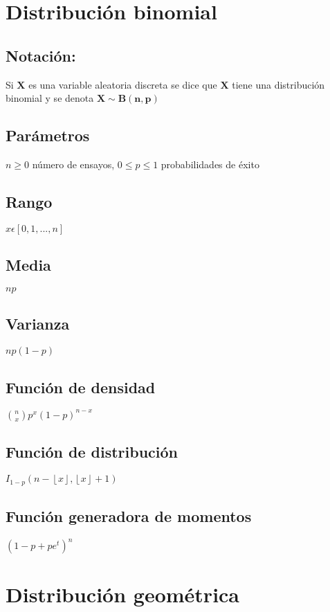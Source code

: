 \documentclass[es-lat]{article}
\begin{document}
\section{Distribución binomial}
\subsection{Notación:}

Si $\mathbf{X}$ es una variable aleatoria discreta se dice que $\mathbf{X}$ tiene una distribución binomial y se denota $\mathbf{X\sim B(n,p)}$ 

\subsection{Parámetros}
$n\geq 0$ número de ensayos, $0\leq p\leq 1$ probabilidades de éxito 

\subsection{Rango}
$x\epsilon [0,1,...,n]$

\subsection{Media}
$np$

\subsection{Varianza}
$np(1-p)$

\subsection{Función de densidad}
$\binom{n}{x}p^{x}(1-p)^{n-x}$

\subsection{Función de distribución}
$I_{1-p}(n-\left \lfloor x \right \rfloor,\left \lfloor x \right \rfloor+1)$

\subsection{Función generadora de momentos}
$(1-p+pe^{t})^{n}$

\section{Distribución geométrica}
\end{document}
